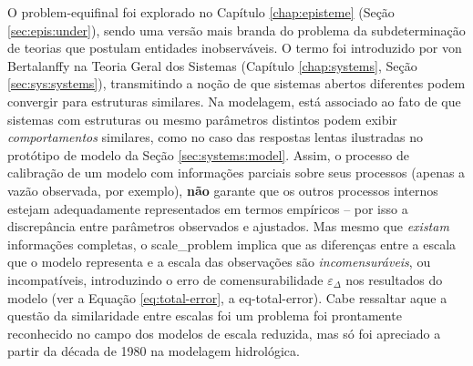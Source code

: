 \documentclass[./main.tex]{subfiles}
\begin{document}
\par O \gls{problem-equifinal} foi explorado no Capítulo \ref{chap:episteme} (Seção \ref{sec:epis:under}), sendo uma versão mais branda do problema da subdeterminação de teorias que postulam entidades inobserváveis. O termo  foi introduzido por von Bertalanffy na Teoria Geral dos Sistemas (Capítulo \ref{chap:systems}, Seção \ref{sec:sys:systems}), transmitindo a noção de que sistemas abertos diferentes podem convergir para estruturas similares. Na modelagem, está associado ao fato de que sistemas com estruturas ou mesmo parâmetros distintos podem exibir \textit{comportamentos} similares, como no caso das respostas lentas ilustradas no protótipo de modelo da Seção \ref{sec:systems:model}. Assim, o processo de calibração de um modelo com informações parciais sobre seus processos (apenas a vazão observada, por exemplo), \textbf{não} garante que os outros processos internos estejam adequadamente representados em termos empíricos -- por isso a discrepância entre parâmetros observados e ajustados. Mas mesmo que \textit{existam} informações completas, o \gls{scale_problem} implica que as diferenças entre a escala que o modelo representa e a escala das observações são \textit{incomensuráveis}, ou incompatíveis, introduzindo o erro de comensurabilidade $\varepsilon_{\Delta}$ nos resultados do modelo (ver a Equação \eqref{eq:total-error}, a \gls{eq-total-error}). Cabe ressaltar aque a questão da similaridade entre escalas foi um problema foi prontamente reconhecido no campo dos modelos de escala reduzida, mas só foi apreciado a partir da década de 1980 na modelagem hidrológica.
\end{document}
